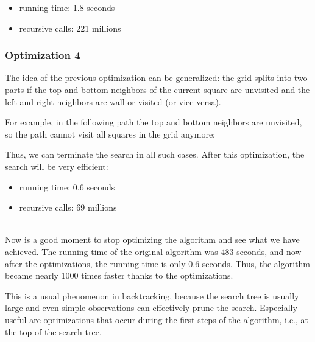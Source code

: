 \begin{itemize}
\item
running time: 1.8 seconds
\item
recursive calls: 221 millions
\end{itemize}

\subsubsection{Optimization 4}

The idea of the previous optimization
can be generalized:
the grid splits into two parts
if the top and bottom neighbors
of the current square are unvisited and
the left and right neighbors are
wall or visited (or vice versa).

For example, in the following path
the top and bottom neighbors are unvisited,
so the path cannot visit all squares
in the grid anymore:
\begin{center}
\end{center}
Thus, we can terminate the search in all such cases.
After this optimization, the search will be
very efficient:

\begin{itemize}
\item
running time: 0.6 seconds
\item
recursive calls: 69 millions
\end{itemize}

~\\
Now is a good moment to stop optimizing
the algorithm and see what we have achieved.
The running time of the original algorithm
was 483 seconds,
and now after the optimizations,
the running time is only 0.6 seconds.
Thus, the algorithm became nearly 1000 times
faster thanks to the optimizations.

This is a usual phenomenon in backtracking,
because the search tree is usually large
and even simple observations can effectively
prune the search.
Especially useful are optimizations that
occur during the first steps of the algorithm,
i.e., at the top of the search tree.

